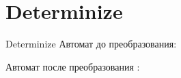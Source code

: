 \section{Determinize}
\begin{frame}{Determinize}
	Автомат до преобразования:


	Автомат после преобразования%
	:


\end{frame}

